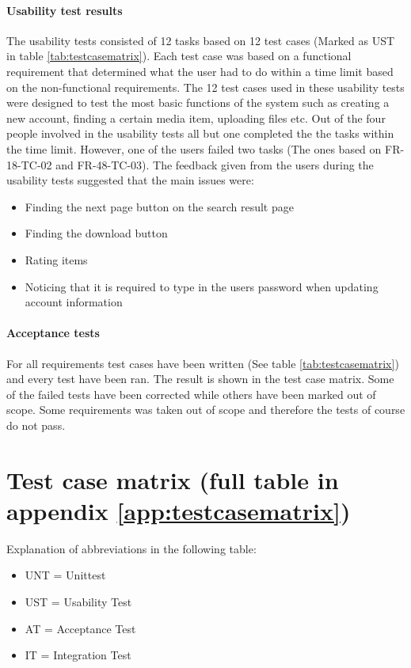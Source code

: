 \documentclass[../report.tex]{subfiles}
\begin{document}
\paragraph{Usability test results}
The usability tests consisted of 12 tasks based on 12 test cases (Marked as UST in table \ref{tab:testcasematrix}). Each test case was based on a functional requirement that determined what the user had to do within a time limit based on the non-functional requirements. The 12 test cases used in these usability tests were designed to test the most basic functions of the system such as creating a new account, finding a certain media item, uploading files etc. 
Out of the four people involved in the usability tests all but one completed the the tasks within the time limit. However, one of the users failed two tasks (The ones based on FR-18-TC-02 and FR-48-TC-03). The feedback given from the users during the usability tests suggested that the main issues were:
\begin{itemize}
\item Finding the next page button on the search result page
\item Finding the download button
\item Rating items
\item Noticing that it is required to type in the users password when updating account information
\end{itemize} 

\paragraph{Acceptance tests}
For all requirements test cases have been written (See table \ref{tab:testcasematrix}) and every test have been ran. The result is shown in the test case matrix. Some of the failed tests have been corrected while others have been marked out of scope. Some requirements was taken out of scope and therefore the tests of course do not pass.



\section{Test case matrix (full table in appendix \ref{app:testcasematrix})}

Explanation of abbreviations in the following table:
\begin{itemize}
\item UNT = Unittest
\item UST = Usability Test
\item AT = Acceptance Test
\item IT = Integration Test
\end{itemize}
\end{document}
